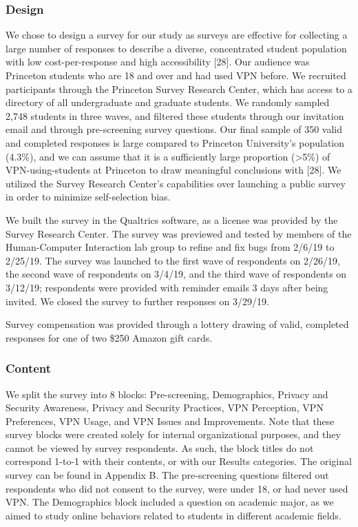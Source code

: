  \subsubsection{Design}

We chose to design a survey for our study as surveys are effective for
collecting a large number of responses to describe a diverse, concentrated
student population with low cost-per-response and high accessibility [28]. Our
audience was Princeton students who are 18 and over and had used VPN before.
We recruited participants through the Princeton Survey Research Center, which
has access to a directory of all undergraduate and graduate students. We
randomly sampled 2,748 students in three waves, and filtered these students
through our invitation email and through pre-screening survey questions. Our
final sample of 350 valid and completed responses is large compared to
Princeton University's population (4.3\%), and we can assume that it is a
sufficiently large proportion (>5\%) of VPN-using-students at Princeton to
draw meaningful conclusions with [28]. We utilized the Survey Research
Center's capabilities over launching a public survey in order to minimize
self-selection bias.

We built the survey in the Qualtrics software, as a license was provided by
the Survey Research Center. The survey was previewed and tested by members of
the Human-Computer Interaction lab group to refine and fix bugs from 2/6/19 to
2/25/19. The survey was launched to the first wave of respondents on 2/26/19,
the second wave of respondents on 3/4/19, and the third wave of respondents on
3/12/19; respondents were provided with reminder emails 3 days after being
invited. We closed the survey to further responses on 3/29/19.

Survey compensation was provided through a lottery drawing of valid, completed
responses for one of two \$250 Amazon gift cards.

\subsubsection{Content}

We split the survey into 8 blocks: Pre-screening, Demographics, Privacy and
Security Awareness, Privacy and Security Practices, VPN Perception, VPN
Preferences, VPN Usage, and VPN Issues and Improvements. Note that these
survey blocks were created solely for internal organizational purposes, and
they cannot be viewed by survey respondents. As such, the block titles do not
correspond 1-to-1 with their contents, or with our Results categories. The
original survey can be found in Appendix B.  The pre-screening questions
filtered out respondents who did not consent to the survey, were under 18, or
had never used VPN. The Demographics block included a question on academic
major, as we aimed to study online behaviors related to students in different
academic fields.

